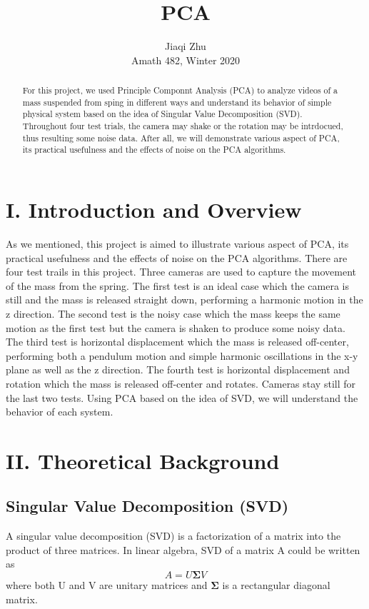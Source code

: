 \documentclass[12pt,letterpaper]{article}
\author{Jiaqi Zhu \\Amath 482, Winter 2020}
\title{PCA}
\begin{document}
\maketitle
\begin{abstract}
For this project, we used Principle Componnt Analysis (PCA) to analyze videos of a mass suspended from sping in different ways and understand its behavior of simple physical system based on the idea of Singular Value Decomposition (SVD). Throughout four test trials, the camera may shake or the rotation may be intrdocued, thus resulting some noise data. After all, we will demonstrate various aspect of PCA, its practical usefulness and the effects of noise on the PCA algorithms.
\end{abstract}
\section*{I. Introduction and Overview}
As we mentioned, this project is aimed to illustrate various aspect of PCA, its practical usefulness and the effects of noise on the PCA algorithms. There are four test trails in this project. Three cameras are used to capture the movement of the mass from the spring. The first test is an ideal case which the camera is still and the mass is released straight down, performing a harmonic motion in the z direction. The second test is the noisy case which the mass keeps the same motion as the first test but the camera is shaken to produce some noisy data. The third test is horizontal displacement which the mass is released off-center, performing both a pendulum motion and simple harmonic oscillations in the x-y plane as well as the z direction. The fourth test is horizontal displacement and rotation which the mass is released off-center and rotates. Cameras stay still for the last two tests. Using PCA based on the idea of SVD, we will understand the behavior of each system. 

\section*{II. Theoretical Background}
\subsection*{Singular Value Decomposition (SVD)}
A singular value decomposition (SVD) is a factorization of a matrix into the product of three matrices. In linear algebra, SVD of a matrix A could be written as 
$$A = U\mathbf{\Sigma}V$$
where both U and V are unitary matrices and $\mathbf{\Sigma}$ is a rectangular diagonal matrix. 
\end{document}
